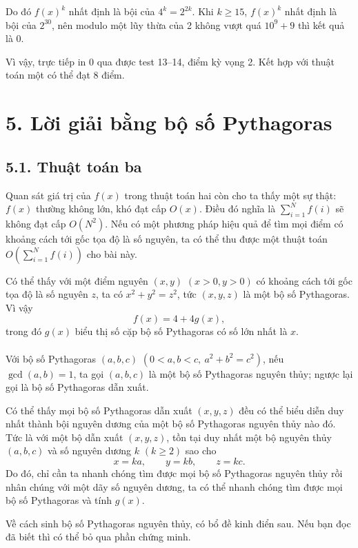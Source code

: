 \documentclass[11pt]{article}
\begin{document}
Do đó \(f(x)^k\) nhất định là bội của \(4^k=2^{2k}\). Khi \(k\ge15\),
\(f(x)^k\) nhất định là bội của \(2^{30}\), nên modulo một lũy thừa của 2
không vượt quá \(10^9+9\) thì kết quả là 0.

Vì vậy, trực tiếp in 0 qua được test 13--14, điểm kỳ vọng 2. Kết hợp với thuật
toán một có thể đạt 8 điểm.

\section*{5. Lời giải bằng bộ số Pythagoras}

\subsection*{5.1. Thuật toán ba}

Quan sát giá trị của \(f(x)\) trong thuật toán hai còn cho ta thấy một sự thật:
\(f(x)\) thường không lớn, khó đạt cấp \(O(x)\). Điều đó nghĩa là
\(\sum_{i=1}^{N} f(i)\) sẽ không đạt cấp \(O(N^2)\). Nếu có một phương pháp
hiệu quả để tìm mọi điểm có khoảng cách tới gốc tọa độ là số nguyên, ta có thể
thu được một thuật toán \(O(\sum_{i=1}^{N} f(i))\) cho bài này.

Có thể thấy với một điểm nguyên \((x,y)\) \((x>0,y>0)\) có khoảng cách tới gốc
tọa độ là số nguyên \(z\), ta có \(x^2+y^2=z^2\), tức \((x,y,z)\) là một bộ số
Pythagoras. Vì vậy
\[
  f(x)=4+4g(x),
\]
trong đó \(g(x)\) biểu thị số cặp bộ số Pythagoras có số lớn nhất là \(x\).

\paragraph{}
Với bộ số Pythagoras \((a,b,c)\)
\((0<a,b<c,\ a^2+b^2=c^2)\), nếu \(\gcd(a,b)=1\), ta gọi \((a,b,c)\) là một
bộ số Pythagoras nguyên thủy; ngược lại gọi là bộ số Pythagoras dẫn xuất.

Có thể thấy mọi bộ số Pythagoras dẫn xuất \((x,y,z)\) đều có thể biểu diễn
duy nhất thành bội nguyên dương của một bộ số Pythagoras nguyên thủy nào đó.
Tức là với một bộ dẫn xuất \((x,y,z)\), tồn tại duy nhất một bộ nguyên thủy
\((a,b,c)\) và số nguyên dương \(k\) \((k\ge2)\) sao cho
\[
  x=ka,\qquad y=kb,\qquad z=kc.
\]
Do đó, chỉ cần ta nhanh chóng tìm được mọi bộ số Pythagoras nguyên thủy rồi
nhân chúng với một dãy số nguyên dương, ta có thể nhanh chóng tìm được mọi bộ
số Pythagoras và tính \(g(x)\).

Về cách sinh bộ số Pythagoras nguyên thủy, có bổ đề kinh điển sau. Nếu bạn đọc
đã biết thì có thể bỏ qua phần chứng minh.
\end{document}
